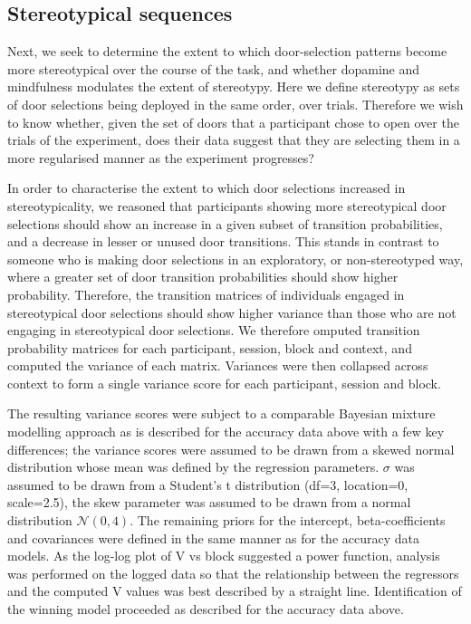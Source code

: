 \documentclass{article}
\begin{document}
\hypertarget{stereotypical-sequences}{%
\subsection{Stereotypical sequences}\label{stereotypical-sequences}}

Next, we seek to determine the extent to which door-selection patterns
become more stereotypical over the course of the task, and whether
dopamine and mindfulness modulates the extent of stereotypy. Here we
define stereotypy as sets of door selections being deployed in the same
order, over trials. Therefore we wish to know whether, given the set of
doors that a participant chose to open over the trials of the
experiment, does their data suggest that they are selecting them in a
more regularised manner as the experiment progresses?

In order to characterise the extent to which door selections increased
in stereotypicality, we reasoned that participants showing more
stereotypical door selections should show an increase in a given subset
of transition probabilities, and a decrease in lesser or unused door
transitions. This stands in contrast to someone who is making door
selections in an exploratory, or non-stereotyped way, where a greater
set of door transition probabilities should show higher probability.
Therefore, the transition matrices of individuals engaged in
stereotypical door selections should show higher variance than those who
are not engaging in stereotypical door selections. We therefore omputed
transition probability matrices for each participant, session, block and
context, and computed the variance of each matrix. Variances were then
collapsed across context to form a single variance score for each
participant, session and block.

The resulting variance scores were subject to a comparable Bayesian
mixture modelling approach as is described for the accuracy data above
with a few key differences; the variance scores were assumed to be drawn
from a skewed normal distribution whose mean was defined by the
regression parameters. \(\sigma\) was assumed to be drawn from a
Student's t distribution (df=3, location=0, scale=2.5), the skew
parameter was assumed to be drawn from a normal distribution
\(\mathcal{N}(0,4)\). The remaining priors for the intercept,
beta-coefficients and covariances were defined in the same manner as for
the accuracy data models. As the log-log plot of V vs block suggested a
power function, analysis was performed on the logged data so that the
relationship between the regressors and the computed V values was best
described by a straight line. Identification of the winning model
proceeded as described for the accuracy data above.
\end{document}

